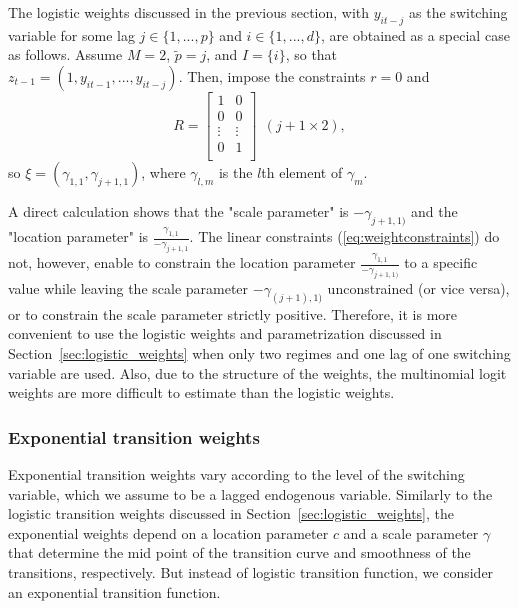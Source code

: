 \documentclass[nojss]{jss}
\begin{document}
The logistic weights discussed in the previous section, with $y_{it-j}$ as the switching variable for some lag $j\in \lbrace 1,...,p \rbrace$ and $i\in \lbrace 1,...,d \rbrace$, are obtained as a special case as follows. Assume $M=2$, $\tilde{p}=j$, and $I=\lbrace i\rbrace$, so that $z_{t-1}=(1, y_{it-1},...,y_{it-j})$. Then, impose the constraints $r=0$ and
\begin{equation}
R=
\begin{bmatrix}
1 & 0 \\
0 & 0 \\
\vdots & \vdots \\
0 & 1 \\
\end{bmatrix}
\ \ (j+1 \times 2),
\end{equation}
so $\xi = (\gamma_{1,1},\gamma_{j+1,1})$, where $\gamma_{l,m}$ is the $l$th element of $\gamma_{m}$.

A direct calculation shows that the "scale parameter" is $-\gamma_{j+1,1)}$ and the "location parameter" is $\frac{\gamma_{1,1}}{-\gamma_{j+1,1}}$. The linear constraints (\ref{eq:weightconstraints}) do not, however, enable to constrain the location parameter $\frac{\gamma_{1,1}}{-\gamma_{j+1,1)}}$ to a specific value while leaving the scale parameter $-\gamma_{(j+1),1)}$ unconstrained (or vice versa), or to constrain the scale parameter strictly positive. Therefore, it is more convenient to use the logistic weights and parametrization discussed in Section~\ref{sec:logistic_weights} when only two regimes and one lag of one switching variable are used. Also, due to the structure of the weights, the multinomial logit weights are more difficult to estimate than the logistic weights.

\subsubsection{Exponential transition weights}

Exponential transition weights \citep[see, e.g.,][]{Terasvirta:1994} vary according to the level of the switching variable, which we assume to be a lagged endogenous variable. Similarly to the logistic transition weights discussed in Section~\ref{sec:logistic_weights}, the exponential weights depend on a location parameter $c$ and a scale parameter $\gamma$ that determine the mid point of the transition curve and smoothness of the transitions, respectively. But instead of logistic transition function, we consider an exponential transition function.
\end{document}
